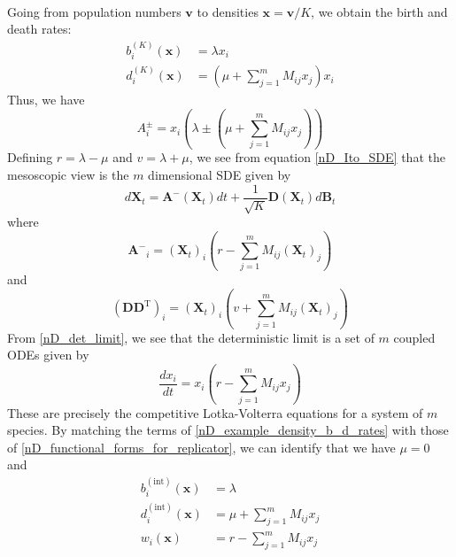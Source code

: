 \\
Going from population numbers $\mathbf{v}$ to densities $\mathbf{x} = \mathbf{v}/K$, we obtain the birth and death rates:
\begin{equation}
\label{nD_example_density_b_d_rates}
\begin{aligned}
b^{(K)}_i(\mathbf{x}) &= \lambda x_i\\
d^{(K)}_i(\mathbf{x}) &= \left(\mu + \sum\limits_{j=1}^{m}M_{ij}x_j\right)x_i
\end{aligned}
\end{equation}
Thus, we have
\begin{equation*}
A^{\pm}_{i} = x_i\left(\lambda \pm \left(\mu + \sum\limits_{j=1}^{m}M_{ij}x_j\right)\right)
\end{equation*}
Defining $r = \lambda - \mu$ and $v = \lambda + \mu$, we see from equation \eqref{nD_Ito_SDE} that the mesoscopic view is the $m$ dimensional SDE given by
\begin{equation}
\label{nD_example_SDE}
d\mathbf{X}_{t} = \mathbf{A^-}(\mathbf{X}_t)dt + \frac{1}{\sqrt{K}}\mathbf{D}(\mathbf{X}_t)d\mathbf{B}_t
\end{equation}
where 
\begin{equation*}
\mathbf{A^-}_i = {(\mathbf{X}_{t})}_i(r - \sum\limits_{j=1}^{m}M_{ij}{(\mathbf{X}_{t})}_j) 
\end{equation*}
and
\begin{equation*}
(\mathbf{D}\mathbf{D}^{\mathrm{T}})_i = {(\mathbf{X}_{t})}_i(v + \sum\limits_{j=1}^{m}M_{ij}{(\mathbf{X}_{t})}_j) 
\end{equation*}
From \eqref{nD_det_limit}, we see that the deterministic limit is a set of $m$ coupled ODEs given by
\begin{equation}
\label{nD_example_det_limit}
\frac{d x_i}{dt} = x_i\left(r - \sum\limits_{j=1}^{m}M_{ij}x_j\right)
\end{equation}
These are precisely the competitive Lotka-Volterra equations for a system of $m$ species. By matching the terms of \eqref{nD_example_density_b_d_rates} with those of \eqref{nD_functional_forms_for_replicator}, we can identify that we have $\mu = 0$ and
\begin{equation}
\label{nD_example_fitness}
\begin{aligned}
b^{(\textrm{int})}_{i}(\mathbf{x}) &= \lambda\\
d^{(\textrm{int})}_i(\mathbf{x}) &= \mu + \sum\limits_{j=1}^{m}M_{ij}x_j\\
w_i(\mathbf{x}) &= r - \sum\limits_{j=1}^{m}M_{ij}x_j
\end{aligned}
\end{equation}

